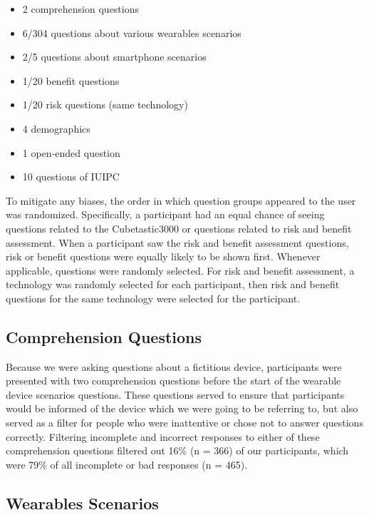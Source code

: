 \documentclass{acm_proc_article-sp}
\begin{document}
\begin{itemize} \itemsep1pt \parskip0pt 
\item 2 comprehension questions 
\item 6/304 questions about various wearables scenarios 
\item 2/5 questions about smartphone scenarios 
\item 1/20 benefit questions 
\item 1/20 risk questions (same technology) 
\item 4 demographics
\item 1 open-ended question 
\item 10 questions of IUIPC \\[-.8cm]
\end{itemize}

To mitigate any biases, the order in which question groups appeared to the user was randomized. Specifically, a participant had an equal chance of seeing questions related to the Cubetastic3000 or questions related to risk and benefit assessment. When a participant saw the risk and benefit assessment questions, risk or benefit questions were equally likely to be shown first. Whenever applicable, questions were randomly selected. For risk and benefit assessment, a technology was randomly selected for each participant, then risk and benefit questions for the same technology were selected for the participant. 

\subsection{Comprehension Questions}
Because we were asking questions about a fictitious device, participants were presented with two comprehension questions before the start of the wearable device scenarios questions. These questions served to ensure that participants would be informed of the device which we were going to be referring to, but also served as a filter for people who were inattentive or chose not to answer questions correctly. Filtering incomplete and incorrect responses to either of these comprehension questions filtered out 16\% (n = 366) of our participants, which were 79\% of all incomplete or bad responses (n = 465). 

\subsection{Wearables Scenarios}
\end{document}
